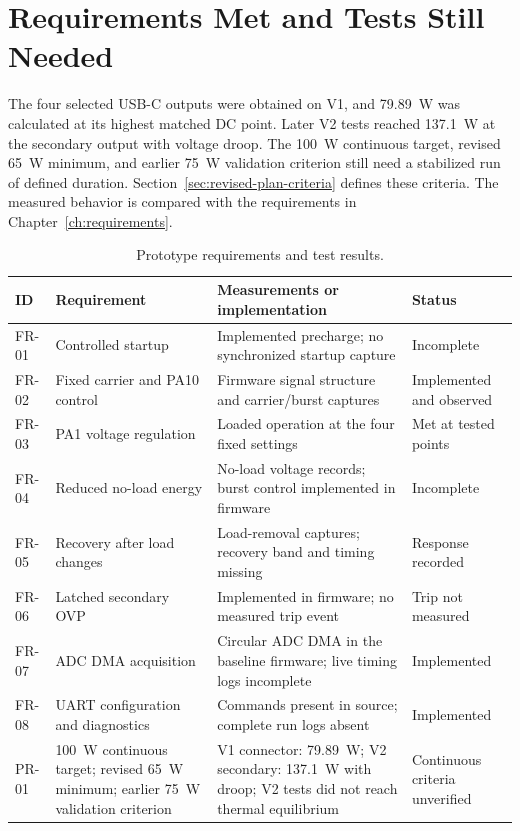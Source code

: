 \section{Requirements Met and Tests Still Needed}
\label{sec:res-compliance}

The four selected USB-C outputs were obtained on V1, and \SI{79.89}{\watt} was calculated at its highest matched DC point. Later V2 tests reached \SI{137.1}{\watt} at the secondary output with voltage droop. The \SI{100}{\watt} continuous target, revised \SI{65}{\watt} minimum, and earlier \SI{75}{\watt} validation criterion still need a stabilized run of defined duration.
Section~\ref{sec:revised-plan-criteria} defines these criteria. The measured behavior is compared with the requirements in
Chapter~\ref{ch:requirements}.

\begin{table}[htbp]
\centering
\caption{Prototype requirements and test results.}
\label{tab:requirements-compliance}
\scriptsize
\begin{tabularx}{\textwidth}{@{}L{0.08\textwidth}L{0.25\textwidth}X L{0.17\textwidth}@{}}
\toprule
ID & Requirement & Measurements or implementation & Status\\
\midrule
FR-01 & Controlled startup & Implemented precharge; no synchronized startup capture & Incomplete\\
FR-02 & Fixed carrier and PA10 control & Firmware signal structure and carrier/burst captures & Implemented and observed\\
FR-03 & PA1 voltage regulation & Loaded operation at the four fixed settings & Met at tested points\\
FR-04 & Reduced no-load energy & No-load voltage records; burst control implemented in firmware & Incomplete\\
FR-05 & Recovery after load changes & Load-removal captures; recovery band and timing missing & Response recorded\\
FR-06 & Latched secondary OVP & Implemented in firmware; no measured trip event & Trip not measured\\
FR-07 & ADC DMA acquisition & Circular ADC DMA in the baseline firmware; live timing logs incomplete & Implemented\\
FR-08 & UART configuration and diagnostics & Commands present in source; complete run logs absent & Implemented\\
\midrule
PR-01 & \SI{100}{\watt} continuous target; revised \SI{65}{\watt} minimum; earlier \SI{75}{\watt} validation criterion & V1 connector: \SI{79.89}{\watt}; V2 secondary: \SI{137.1}{\watt} with droop; V2 tests did not reach thermal equilibrium & Continuous criteria unverified\\

\end{tabularx}
\end{table}
